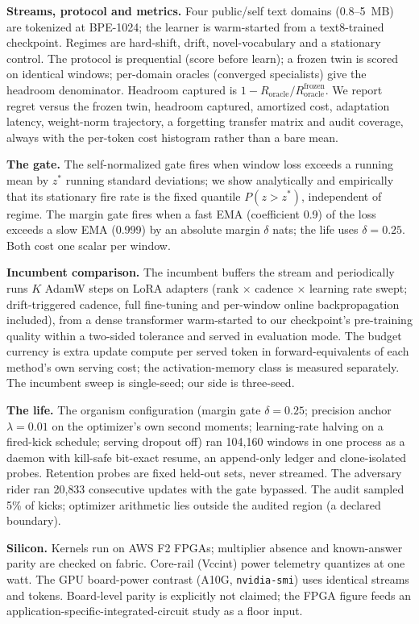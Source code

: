 \documentclass[sn-nature]{sn-jnl}   %
\newcommand{\heading}[1]{\vspace{4pt}\noindent\textbf{#1}\hspace{0.6em}}
\begin{document}
\heading{Streams, protocol and metrics.}
Four public/self text domains (0.8--5~MB) are tokenized at BPE-1024; the learner
is warm-started from a text8-trained checkpoint. Regimes are hard-shift, drift,
novel-vocabulary and a stationary control. The protocol is prequential (score
before learn); a frozen twin is scored on identical windows; per-domain oracles
(converged specialists) give the headroom denominator. Headroom captured is
$1-R_{\mathrm{oracle}}/R^{\mathrm{frozen}}_{\mathrm{oracle}}$. We report regret
versus the frozen twin, headroom captured, amortized cost, adaptation latency,
weight-norm trajectory, a forgetting transfer matrix and audit coverage, always
with the per-token cost histogram rather than a bare mean.

\heading{The gate.}
The self-normalized gate fires when window loss exceeds a running mean by
$z^{*}$ running standard deviations; we show analytically and empirically that
its stationary fire rate is the fixed quantile $P(z>z^{*})$, independent of
regime. The margin gate fires when a fast EMA (coefficient 0.9) of the loss
exceeds a slow EMA (0.999) by an absolute margin $\delta$ nats; the life uses
$\delta{=}0.25$. Both cost one scalar per window.

\heading{Incumbent comparison.}
The incumbent buffers the stream and periodically runs $K$ AdamW steps on LoRA
adapters (rank $\times$ cadence $\times$ learning rate swept; drift-triggered
cadence, full fine-tuning and per-window online backpropagation included), from a
dense transformer warm-started to our checkpoint's pre-training quality within a
two-sided tolerance and served in evaluation mode. The budget currency is extra
update compute per served token in forward-equivalents of each method's own
serving cost; the activation-memory class is measured separately. The incumbent
sweep is single-seed; our side is three-seed.

\heading{The life.}
The organism configuration (margin gate $\delta{=}0.25$; precision anchor
$\lambda{=}0.01$ on the optimizer's own second moments; learning-rate halving on
a fired-kick schedule; serving dropout off) ran 104{,}160 windows in one process
as a daemon with kill-safe bit-exact resume, an append-only ledger and
clone-isolated probes. Retention probes are fixed held-out sets, never streamed.
The adversary rider ran 20{,}833 consecutive updates with the gate bypassed. The
audit sampled 5\% of kicks; optimizer arithmetic lies outside the audited region
(a declared boundary).

\heading{Silicon.}
Kernels run on AWS F2 FPGAs; multiplier absence and known-answer parity are
checked on fabric. Core-rail (Vccint) power telemetry quantizes at one watt.
The GPU board-power contrast (A10G, \texttt{nvidia-smi}) uses identical streams
and tokens. Board-level parity is explicitly not claimed; the FPGA figure feeds
an application-specific-integrated-circuit study as a floor input.
\end{document}
